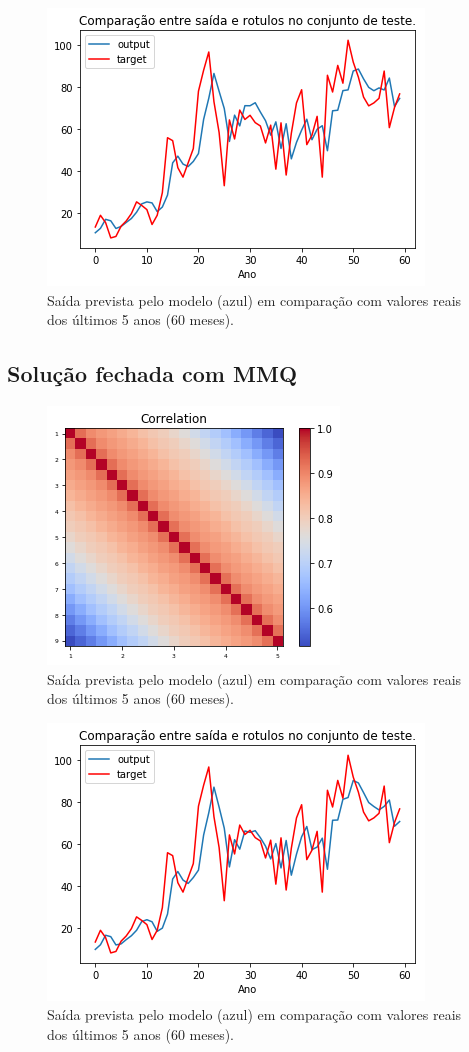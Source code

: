 \documentclass[a4paper, 12pt]{article}
\begin{document}
\begin{figure}[h!]
  \includegraphics{images/wrapper.png}
    \caption{Saída prevista pelo modelo (azul) em comparação com valores reais dos últimos 5 anos (60 meses).}
\end{figure}

\subsection*{Solução fechada com MMQ}

\begin{figure}[h!]
  \includegraphics{images/corr.png}
    \caption{Saída prevista pelo modelo (azul) em comparação com valores reais dos últimos 5 anos (60 meses).}
\end{figure}

\begin{figure}[h!]
  \includegraphics{images/filter.png}
    \caption{Saída prevista pelo modelo (azul) em comparação com valores reais dos últimos 5 anos (60 meses).}
\end{figure}
\end{document}
